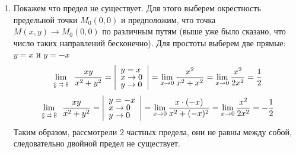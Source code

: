 \begin{enumerate}
	\item Покажем что предел не существует. Для этого выберем окрестность предельной точки $M_0(0,0)$ и предположим, что точка $M(x, y) \to M_0(0, 0)$ по различным путям (выше уже было сказано, что число таких направлений бесконечно). Для простоты выберем две прямые: $y = x$ и $y = -x$
	\begin{align*}
		\lim_{\tiny{\begin{array}{c} x \to 0 \\[-3pt] y \to 0 \end{array}}} \frac{xy}{x^2 + y^2}
		= \left| \begin{array}{l} y = x \\[-3pt] x \to 0 \\[-3pt] y \to 0 \end{array} \right| = \lim_{x \to 0} \frac{x^2}{x^2 + x^2} = \lim_{x \to 0} \frac{x^2}{2x^2} = \frac{1}{2}
	\end{align*}
	\begin{align*}
		\lim_{\tiny{\begin{array}{c} x \to 0 \\[-3pt] y \to 0 \end{array}}} \frac{xy}{x^2 + y^2}
		= \left| \begin{array}{l} y = -x \\[-3pt] x \to 0 \\[-3pt] y \to 0 \end{array} \right| = \lim_{x \to 0} \frac{x \cdot (-x)}{x^2 + (-x)^2} = \lim_{x \to 0} \frac{x^2}{2x^2} = -\frac{1}{2}
	\end{align*}
	Таким образом, рассмотрели 2 частных предела, они не равны между собой, следовательно двойной предел не существует.
\end{enumerate}